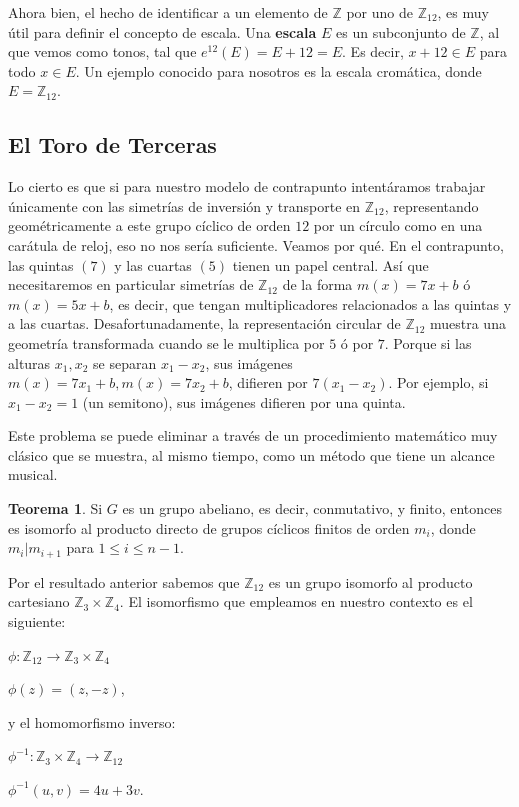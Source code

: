 \documentclass[letterpaper,12pt]{book}
\theoremstyle{definition} \newtheorem{Def}{Definición}[chapter]
\theoremstyle{definition} \newtheorem{Teo}{Teorema}[chapter]
\theoremstyle{definition} \newtheorem{Pro}{Proposición}[chapter]
\theoremstyle{definition} \newtheorem{Lema}{Lema}[chapter]
\begin{document}
 Ahora bien, el hecho de identificar a un elemento de $\mathbb{Z}$ por uno de $\mathbb{Z}_{12}$, es muy útil para definir el concepto de escala. Una \textbf{escala} $E$ es un subconjunto de $\mathbb{Z}$, al que vemos como tonos, tal que $e^{12}(E)=E+12=E$. Es decir, $x+12 \in E$ para todo $x \in E$. Un ejemplo conocido para nosotros es la escala cromática, donde $E=\mathbb{Z}_{12}$.
 
\subsection{El Toro de Terceras}\label{ToroTerceras}
  
 Lo cierto es que si para nuestro modelo de contrapunto intentáramos trabajar únicamente con las simetrías de inversión y transporte en $\mathbb{Z}_{12}$, representando geométricamente a este grupo cíclico de orden $12$ por un círculo como en una carátula de reloj, eso no nos sería suficiente. Veamos por qué. En el contrapunto, las quintas $(7)$ y las cuartas $(5)$ tienen un papel central. Así que necesitaremos en particular simetrías de $\mathbb{Z}_{12}$ de la forma $m(x)=7x+b$ ó $m(x)=5x+b$, es decir, que tengan multiplicadores relacionados a las quintas y a las cuartas. Desafortunadamente, la representación circular de $\mathbb{Z}_{12}$ muestra una geometría transformada cuando se le multiplica por $5$ ó por $7$. Porque si las alturas $x_1, x_2$ se separan $x_1-x_2$, sus imágenes $m(x)=7x_1+b, m(x)=7x_2+b$, difieren por $7(x_1-x_2)$. Por ejemplo, si $x_1-x_2=1$  (un semitono), sus imágenes difieren por una quinta. 
 
 Este problema se puede eliminar a través de un procedimiento matemático muy clásico que se muestra, al mismo tiempo, como un método que tiene un alcance musical. 
  
\begin{Teo}
Si $G$ es un grupo abeliano, es decir, conmutativo, y finito, entonces es isomorfo al producto directo de grupos cíclicos finitos de orden $m_i$, donde $m_i|m_{i+1}$ para $1 \le i \le n-1$. 
\end{Teo}
 
 Por el resultado anterior sabemos que $\mathbb{Z}_{12}$ es un grupo isomorfo al producto cartesiano   $\mathbb{Z}_{3} \times \mathbb{Z}_{4}$.  El isomorfismo que empleamos en nuestro contexto es el siguiente:
 
\begin{description}
\centering
 \item $ \phi: \mathbb{Z}_{12} \to \mathbb{Z}_{3} \times \mathbb{Z}_{4}$
 \item $ \phi(z)=(z,-z)$,
\end{description}
 y el homomorfismo inverso:
\begin{description}
\centering
 \item $ \phi^{-1}: \mathbb{Z}_{3} \times \mathbb{Z}_{4} \to \mathbb{Z}_{12}$
 \item $ \phi^{-1}(u,v)=4u+3v$.
\end{description}
\end{document}
